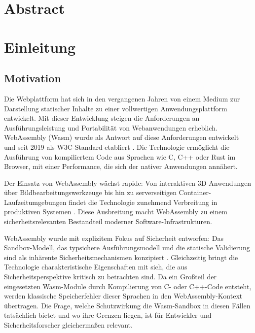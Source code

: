 \section*{Abstract}

\clearpage

\section{Einleitung}

\subsection{Motivation}

Die Webplattform hat sich in den vergangenen Jahren von einem Medium zur Darstellung statischer Inhalte zu einer vollwertigen Anwendungsplattform entwickelt. Mit dieser Entwicklung steigen die Anforderungen an Ausführungsleistung und Portabilität von Webanwendungen erheblich. WebAssembly (Wasm) wurde als Antwort auf diese Anforderungen entwickelt und seit 2019 als W3C-Standard etabliert \cite{w3c2019wasmrec}. Die Technologie ermöglicht die Ausführung von kompiliertem Code aus Sprachen wie C, C++ oder Rust im Browser, mit einer Performance, die sich der nativer Anwendungen annähert.

Der Einsatz von WebAssembly wächst rapide: Von interaktiven 3D-Anwendungen über Bildbearbeitungswerkzeuge bis hin zu serverseitigen Container-Laufzeitumgebungen findet die Technologie zunehmend Verbreitung in produktiven Systemen \cite{PERRONE2025100728}. Diese Ausbreitung macht WebAssembly zu einem sicherheitsrelevanten Bestandteil moderner Software-Infrastrukturen.

WebAssembly wurde mit explizitem Fokus auf Sicherheit entworfen: Das Sandbox-Modell, das typsichere Ausführungsmodell und die statische Validierung sind als inhärente Sicherheitsmechanismen konzipiert \cite{wasmcoreW3C}. Gleichzeitig bringt die Technologie charakteristische Eigenschaften mit sich, die aus Sicherheitsperspektive kritisch zu betrachten sind. Da ein Großteil der eingesetzten Wasm-Module durch Kompilierung von C- oder C++-Code entsteht, werden klassische Speicherfehler dieser Sprachen in den WebAssembly-Kontext übertragen. Die Frage, welche Schutzwirkung die Wasm-Sandbox in diesen Fällen tatsächlich bietet und wo ihre Grenzen liegen, ist für Entwickler und Sicherheitsforscher gleichermaßen relevant.

